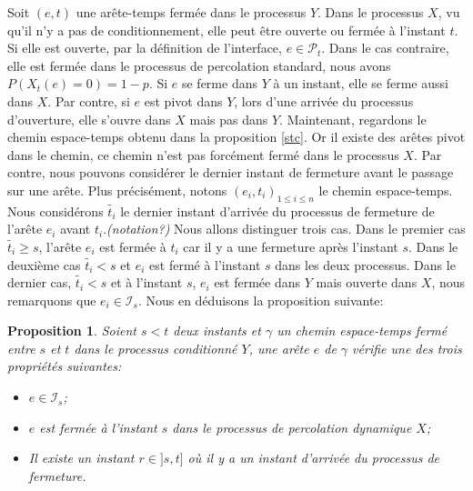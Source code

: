 \documentclass[titlepage,a4paper,12pt]{article}
\newcounter{prop}
\newtheorem{propo}[prop]{Proposition}
\begin{document}
Soit $(e,t)$ une arête-temps fermée dans le processus $Y$. Dans le processus $X$, vu qu'il n'y a pas de conditionnement, elle peut être ouverte ou fermée à l'instant $t$. Si elle est ouverte, par la définition de l'interface, $e\in \mathcal{P}_t$. Dans le cas contraire, elle est fermée dans le processus de percolation standard, nous avons $P(X_t(e) = 0) = 1-p$. Si $e$ se ferme dans $Y$ à un instant, elle se ferme aussi dans $X$. Par contre, si $e$ est pivot dans $Y$, lors d'une arrivée du processus d'ouverture, elle s'ouvre dans $X$ mais pas dans $Y$. Maintenant, regardons le chemin espace-temps obtenu dans la proposition \ref{stc}. Or il existe des arêtes pivot dans le chemin, ce chemin n'est pas forcément fermé dans le processus $X$. Par contre, nous pouvons considérer le dernier instant de fermeture avant le passage sur une arête. Plus précisément, notons $(e_i,t_i)_{1\leqslant i \leqslant n}$ le chemin espace-temps. Nous considérons $\tilde{t_i}$ le dernier instant d'arrivée du processus de fermeture de l'arête $e_i$ avant $t_i$.\emph{\color{blue}(notation?)} Nous allons distinguer trois cas. Dans le premier cas $\tilde{t_i}\geqslant s$, l'arête $e_i$ est fermée à $t_i$ car il y a une fermeture après l'instant $s$. Dans le deuxième cas $\tilde{t_i}< s$ et $e_i$ est fermé à l'instant $s$ dans les deux processus. Dans le dernier cas, $\tilde{t_i}< s$ et à l'instant $s$, $e_i$ est fermée dans $Y$ mais ouverte dans $X$, nous remarquons que $e_i \in \mathcal{I}_s$. Nous en déduisons la proposition suivante:

\begin{propo}\label{couple} Soient $s<t$ deux instants et $\gamma$ un chemin espace-temps fermé entre $s$ et $t$ dans le processus conditionné $Y$, une arête $e$ de $\gamma$ vérifie une des trois propriétés suivantes:
\begin{itemize}[leftmargin = 0.9cm]
\item[(A)] $e\in \mathcal{I}_s$;
\item[(B)] $e$ est fermée à l'instant $s$ dans le processus de percolation dynamique $X$;
\item[(C)] Il existe un instant $r\in ]s,t]$ où il y a un instant d'arrivée du processus de fermeture.
\end{itemize}
\end{propo}
\end{document}
